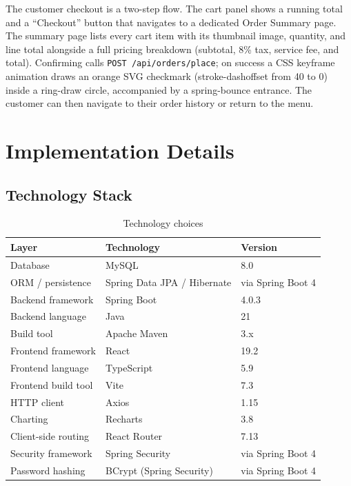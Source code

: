 \documentclass[12pt,a4paper]{article}
\begin{document}
\begin{description}[style=nextline]
    \item[Checkout and order summary flow]
    The customer checkout is a two-step flow. The cart panel shows a running
    total and a ``Checkout'' button that navigates to a dedicated Order Summary
    page. The summary page lists every cart item with its thumbnail image,
    quantity, and line total alongside a full pricing breakdown (subtotal,
    8\% tax, service fee, and total). Confirming calls
    \texttt{POST /api/orders/place}; on success a CSS keyframe animation draws
    an orange SVG checkmark (stroke-dashoffset from 40 to 0) inside a
    ring-draw circle, accompanied by a spring-bounce entrance. The customer
    can then navigate to their order history or return to the menu.
\end{description}

\section{Implementation Details}

\subsection{Technology Stack}

\begin{table}[H]
\centering
\caption{Technology choices}
\label{tab:tech}
\renewcommand{\arraystretch}{1.2}
\begin{tabular}{@{}lll@{}}
\toprule
\textbf{Layer} & \textbf{Technology} & \textbf{Version} \\
\midrule
Database            & MySQL                          & 8.0 \\
ORM / persistence   & Spring Data JPA / Hibernate    & via Spring Boot 4 \\
Backend framework   & Spring Boot                    & 4.0.3 \\
Backend language    & Java                           & 21 \\
Build tool          & Apache Maven                   & 3.x \\
Frontend framework  & React                          & 19.2 \\
Frontend language   & TypeScript                     & 5.9 \\
Frontend build tool & Vite                           & 7.3 \\
HTTP client         & Axios                          & 1.15 \\
Charting            & Recharts                       & 3.8 \\
Client-side routing & React Router                   & 7.13 \\
Security framework  & Spring Security                & via Spring Boot 4 \\
Password hashing    & BCrypt (Spring Security)       & via Spring Boot 4 \\
\bottomrule
\end{tabular}
\end{table}
\end{document}

